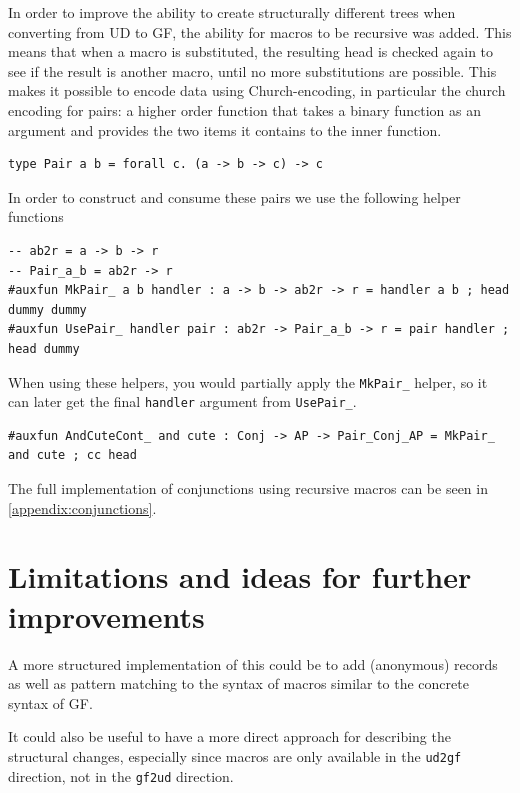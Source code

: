 In order to improve the ability to create structurally different trees when converting from UD to GF, the ability for macros to be recursive was added. This means that when a macro is substituted, the resulting head is checked again to see if the result is another macro, until no more substitutions are possible. This makes it possible to encode data using Church-encoding, in particular the church encoding for pairs: a higher order function that takes a binary function as an argument and provides the two items it contains to the inner function.

\begin{verbatim}
type Pair a b = forall c. (a -> b -> c) -> c
\end{verbatim}

In order to construct and consume these pairs we use the following helper functions
\begin{lstlisting}
-- ab2r = a -> b -> r
-- Pair_a_b = ab2r -> r
#auxfun MkPair_ a b handler : a -> b -> ab2r -> r = handler a b ; head dummy dummy
#auxfun UsePair_ handler pair : ab2r -> Pair_a_b -> r = pair handler ; head dummy
\end{lstlisting}

When using these helpers, you would partially apply the \verb|MkPair_| helper, so it can later get the final \verb|handler| argument from \verb|UsePair_|.

\begin{lstlisting}
#auxfun AndCuteCont_ and cute : Conj -> AP -> Pair_Conj_AP = MkPair_ and cute ; cc head
\end{lstlisting}

The full implementation of conjunctions using recursive macros can be seen in \autoref{appendix:conjunctions}.



\section{Limitations and ideas for further improvements}

A more structured implementation of this could be to add (anonymous) records as well as pattern matching to the syntax of macros similar to the concrete syntax of GF. 

It could also be useful to have a more direct approach for describing the structural changes, especially since macros are only available in the \texttt{ud2gf} direction, not in the \texttt{gf2ud} direction.
